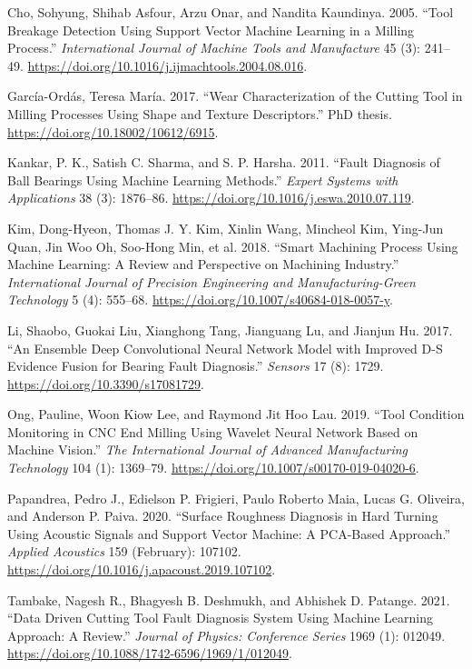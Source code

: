 \documentclass[
  letterpaper,
  DIV=11,
  numbers=noendperiod]{scrartcl}
\newlength{\cslhangindent}
\newlength{\cslentryspacingunit} %
\newenvironment{CSLReferences}[2] %
 {%
  \setlength{\parindent}{0pt}
  \ifodd #1
  \let\oldpar\par
  \def\par{\hangindent=\cslhangindent\oldpar}
  \fi
  \setlength{\parskip}{#2\cslentryspacingunit}
 }%
 {}
\begin{document}
\hypertarget{refs}{}
\begin{CSLReferences}{1}{0}
\leavevmode{}%
Cho, Sohyung, Shihab Asfour, Arzu Onar, and Nandita Kaundinya. 2005.
{``Tool Breakage Detection Using Support Vector Machine Learning in a
Milling Process.''} \emph{International Journal of Machine Tools and
Manufacture} 45 (3): 241--49.
\url{https://doi.org/10.1016/j.ijmachtools.2004.08.016}.

\leavevmode{}%
García-Ordás, Teresa María. 2017. {``Wear Characterization of the
Cutting Tool in Milling Processes Using Shape and Texture
Descriptors.''} PhD thesis. \url{https://doi.org/10.18002/10612/6915}.

\leavevmode{}%
Kankar, P. K., Satish C. Sharma, and S. P. Harsha. 2011. {``Fault
Diagnosis of Ball Bearings Using Machine Learning Methods.''}
\emph{Expert Systems with Applications} 38 (3): 1876--86.
\url{https://doi.org/10.1016/j.eswa.2010.07.119}.

\leavevmode{}%
Kim, Dong-Hyeon, Thomas J. Y. Kim, Xinlin Wang, Mincheol Kim, Ying-Jun
Quan, Jin Woo Oh, Soo-Hong Min, et al. 2018. {``Smart Machining Process
Using Machine Learning: A Review and Perspective on Machining
Industry.''} \emph{International Journal of Precision Engineering and
Manufacturing-Green Technology} 5 (4): 555--68.
\url{https://doi.org/10.1007/s40684-018-0057-y}.

\leavevmode{}%
Li, Shaobo, Guokai Liu, Xianghong Tang, Jianguang Lu, and Jianjun Hu.
2017. {``An {Ensemble} {Deep} {Convolutional} {Neural} {Network} {Model}
with {Improved} {D}-{S} {Evidence} {Fusion} for {Bearing} {Fault}
{Diagnosis}.''} \emph{Sensors} 17 (8): 1729.
\url{https://doi.org/10.3390/s17081729}.

\leavevmode{}%
Ong, Pauline, Woon Kiow Lee, and Raymond Jit Hoo Lau. 2019. {``Tool
Condition Monitoring in {CNC} End Milling Using Wavelet Neural Network
Based on Machine Vision.''} \emph{The International Journal of Advanced
Manufacturing Technology} 104 (1): 1369--79.
\url{https://doi.org/10.1007/s00170-019-04020-6}.

\leavevmode{}%
Papandrea, Pedro J., Edielson P. Frigieri, Paulo Roberto Maia, Lucas G.
Oliveira, and Anderson P. Paiva. 2020. {``Surface Roughness Diagnosis in
Hard Turning Using Acoustic Signals and Support Vector Machine: {A}
{PCA}-Based Approach.''} \emph{Applied Acoustics} 159 (February):
107102. \url{https://doi.org/10.1016/j.apacoust.2019.107102}.

\leavevmode{}%
Tambake, Nagesh R., Bhagyesh B. Deshmukh, and Abhishek D. Patange. 2021.
{``Data {Driven} {Cutting} {Tool} {Fault} {Diagnosis} {System} {Using}
{Machine} {Learning} {Approach}: {A} {Review}.''} \emph{Journal of
Physics: Conference Series} 1969 (1): 012049.
\url{https://doi.org/10.1088/1742-6596/1969/1/012049}.

\end{CSLReferences}
\end{document}
